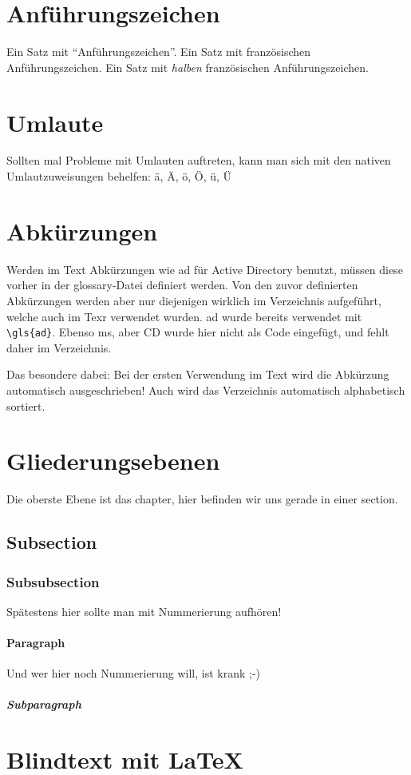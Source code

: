 \section{Anführungszeichen}
Ein Satz mit "`Anführungszeichen"'.
Ein Satz mit französischen \frqq Anführungszeichen\flqq.
Ein Satz mit \textit{halben} französischen \frq Anführungszeichen\flq.


\section{Umlaute}
Sollten mal Probleme mit Umlauten auftreten, kann man sich mit den nativen Umlautzuweisungen behelfen:
\"a, \"A, \"o, \"O, \"u, \"U


\section{Abkürzungen}
Werden im Text Abkürzungen wie \gls{ad} für Active Directory benutzt, müssen diese vorher in der glossary-Datei definiert werden.
Von den zuvor definierten Abkürzungen werden aber nur diejenigen wirklich im Verzeichnis aufgeführt, welche auch im Texr verwendet wurden.
\gls{ad} wurde bereits verwendet mit \verb+\gls{ad}+. Ebenso \gls{ms}, aber CD wurde hier nicht als Code eingefügt, und fehlt daher im Verzeichnis.

Das besondere dabei: Bei der ersten Verwendung im Text wird die Abkürzung automatisch ausgeschrieben! Auch wird das Verzeichnis automatisch alphabetisch sortiert.


\section{Gliederungsebenen}
Die oberste Ebene ist das chapter, hier befinden wir uns gerade in einer section.
\subsection{Subsection}
\subsubsection{Subsubsection}
Spätestens hier sollte man mit Nummerierung aufhören!
\paragraph{Paragraph}
Und wer hier noch Nummerierung will, ist krank ;-)
\subparagraph{Subparagraph}

\section{Blindtext mit \LaTeX}
\lipsum